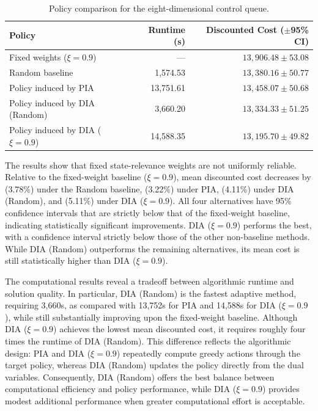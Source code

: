 \documentclass[sglanonrev]{informs4}
\begin{document}
\begin{table}[ht]
\centering
\footnotesize
\caption{Policy comparison for the eight-dimensional control queue.}
\begin{tabular}{lrr}
  \toprule
  \textbf{Policy} & \textbf{Runtime (s)} & \textbf{Discounted Cost} \textbf{($\pm$95\% \ac{CI})} \\
  \midrule
  Fixed weights ($\xi=0.9$)   & ---      & $13,906.48 \pm 53.08$  \\
  Random baseline              & 1,574.53  & $13,380.16 \pm 50.77$  \\
  Policy induced by \ac{PIA}        & 13,751.61 & $13,458.07 \pm 50.68$  \\
  Policy induced by \ac{DIA} (Random) & 3,660.20  & $13,334.33 \pm 51.25$  \\
  Policy induced by \ac{DIA} ($\xi = 0.9$) & 14,588.35  & $13,195.70 \pm 49.82$   \\
  \bottomrule
\end{tabular}
\label{tab:policy_comparison_8d_queue}
\end{table}

The results show that fixed state-relevance weights are not uniformly reliable. Relative to the fixed-weight baseline ($\xi=0.9$), mean discounted cost decreases by (3.78\%) under the Random baseline, (3.22\%) under \ac{PIA}, (4.11\%) under \ac{DIA} (Random), and (5.11\%) under \ac{DIA} ($\xi=0.9$). All four alternatives have 95\% confidence intervals that are strictly below that of the fixed-weight baseline, indicating statistically significant improvements. \ac{DIA} ($\xi=0.9$) performs the best, with a confidence interval strictly below those of the other non-baseline methods. While \ac{DIA} (Random) outperforms the remaining alternatives, its mean cost is still statistically higher than \ac{DIA} ($\xi = 0.9$).

The computational results reveal a tradeoff between algorithmic runtime and solution quality. In particular, \ac{DIA} (Random) is the fastest adaptive method, requiring 3,660s, as compared with 13,752s for \ac{PIA} and 14,588s for \ac{DIA} ($\xi=0.9$), while still substantially improving upon the fixed-weight baseline. Although \ac{DIA} ($\xi=0.9$) achieves the lowest mean discounted cost, it requires roughly four times the runtime of \ac{DIA} (Random). This difference reflects the algorithmic design: \ac{PIA} and \ac{DIA} ($\xi=0.9$) repeatedly compute greedy actions through the target policy, whereas \ac{DIA} (Random) updates the policy directly from the dual variables. Consequently, \ac{DIA} (Random) offers the best balance between computational efficiency and policy performance, while \ac{DIA} ($\xi=0.9$) provides modest additional performance when greater computational effort is acceptable.
\end{document}
